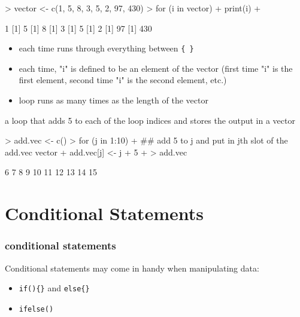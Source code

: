 \documentclass[handout]{beamer}
\newcommand{\red}{\color{red}}
\newcommand{\black}{\color{black}}
\begin{document}
\begin{frame}[fragile]
\red
\footnotesize
\begin{Schunk}
\begin{Sinput}
> vector <- c(1, 5, 8, 3, 5, 2, 97, 430)
> for (i in vector) {
+     print(i)
+ }
\end{Sinput}
\begin{Soutput}
[1] 1
[1] 5
[1] 8
[1] 3
[1] 5
[1] 2
[1] 97
[1] 430
\end{Soutput}
\end{Schunk}
\bigskip \pause
\black \normalsize
\begin{itemize}
\item each time runs through everything between {\tt \red \{ \}}
\item each time, "i" is defined to be an element of the vector (first time "i" is the first element, second time "i" is the second element, etc.)
\item loop runs as many times as the length of the vector
\end{itemize}
\end{frame}

\begin{frame}[fragile]
a loop that adds 5 to each of the loop indices and stores the output in a vector
\bigskip
\red
\footnotesize
\begin{Schunk}
\begin{Sinput}
> add.vec <- c()
> for (j in 1:10){
+   ## add 5 to j and put in jth slot of the add.vec vector
+   add.vec[j] <- j + 5 
+ }
> add.vec
\end{Sinput}
\begin{Soutput}
 [1]  6  7  8  9 10 11 12 13 14 15
\end{Soutput}
\end{Schunk}
\end{frame}

\section{Conditional Statements}
\begin{frame}[fragile]
\frametitle{conditional statements}
\pause
Conditional statements may come in handy when manipulating data:
\pause
\bigskip
\begin{itemize}
\item {\tt \red if()\{\}} and {\tt \red else\{\}}
\item {\tt \red ifelse()}
\end{itemize}
\end{frame}
\end{document}
